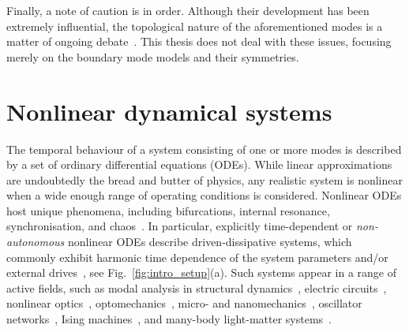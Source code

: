 Finally, a note of caution is in order. Although their development has been extremely influential, the topological nature of the aforementioned modes is a matter of ongoing debate~\cite{Saba_2020, Qian_2018}. This thesis does not deal with these issues, focusing merely on the boundary mode models and their symmetries. 

\section{Nonlinear dynamical systems} \label{sec:intro_nonlin}

The temporal behaviour of a system consisting of one or more modes is described by a set of ordinary differential equations (ODEs). While linear approximations are undoubtedly the bread and butter of physics, any realistic system is nonlinear when a wide enough range of operating conditions is considered. Nonlinear ODEs host unique phenomena, including bifurcations, internal resonance, synchronisation, and chaos~\cite{vibrations1950jj,dykman1975theory,Strogatz,Rand_2005, Nayfeh_Mook,Schuster2009,Mangussi2016}. In particular, explicitly time-dependent or \textit{non-autonomous} nonlinear ODEs describe driven-dissipative systems, which commonly exhibit harmonic time dependence of the system parameters and/or external drives~\cite{Richards}, see Fig.~\ref{fig:intro_setup}(a). 
Such systems appear in a range of active fields, such as modal analysis in structural dynamics~\cite{Ewins2000,Kerschen2006}, electric circuits~\cite{Rohde2005,Rubiola2008,Fallis2003}, nonlinear optics~\cite{Haken1975,Shen2002,del2007optical,Rodriguez2016,DelPino2016,Sounas2018,Zambon_2020,peters2021limit}, optomechanics~\cite{Aspelmeyer2014,Pelka2020,Burgwal2020,Roque2020}, micro- and nanomechanics~\cite{Poot2012,Papariello_2016,Guttinger2017,Chen2017,Houri2019,Houri2020,Yang_2021a, Yang_2021b, Mohammadi2020,Huber_2020,2018ApPhL.112w3105E,2021arXiv210911943H, Kosata_2020}, oscillator networks~\cite{2016PhRvA..93d3827O,2019PhRvL.123l4301H,Ozawa2019,del2021non,2022arXiv220106315P, Kosata_2021},  Ising machines~\cite{Wang2013,Bello2019a,CalvaneseStrinati2019,2019PhRvL.123y4102F,CalvaneseStrinati2020,Heugel_2022}, and many-body light-matter systems~\cite{griffin1996bose,Carusotto2013,Soriente2018,Kirton2019,Soriente2020,Soriente2021,2021PhRvX..11d1046F}.

